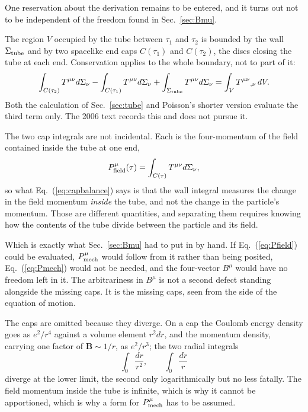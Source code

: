\documentclass[preprint]{aastex701}
\begin{document}
One reservation about the derivation remains to be entered, and it turns out not
to be independent of the freedom found in Sec.~\ref{sec:Bmu}.

The region $V$ occupied by the tube between $\tau_1$ and $\tau_2$ is bounded by
the wall $\Sigma_{\rm tube}$ and by two spacelike end caps $C(\tau_1)$ and
$C(\tau_2)$, the discs closing the tube at each end. Conservation applies to the
whole boundary, not to part of it:
\begin{equation}
\int_{C(\tau_2)} T^{\mu\nu}d\Sigma_\nu
- \int_{C(\tau_1)} T^{\mu\nu}d\Sigma_\nu
+ \int_{\Sigma_{\rm tube}} T^{\mu\nu}d\Sigma_\nu
= \int_V T^{\mu\nu}{}_{,\nu}\,dV .
\label{eq:capbalance}
\end{equation}
Both the calculation of Sec.~\ref{sec:tube} and Poisson's shorter version
\citep{poisson2004}
evaluate the third term only. The 2006 text records this and does not pursue it.

The two cap integrals are not incidental. Each is the four-momentum of the field
contained inside the tube at one end,
\begin{equation}
P_{\rm field}^\mu(\tau) = \int_{C(\tau)} T^{\mu\nu}d\Sigma_\nu ,
\label{eq:Pfield}
\end{equation}
so what Eq.~(\ref{eq:capbalance}) says is that the wall integral measures the
change in the field momentum \emph{inside} the tube, and not the change in the
particle's momentum. Those are different quantities, and separating them
requires knowing how the contents of the tube divide between the particle and
its field.

Which is exactly what Sec.~\ref{sec:Bmu} had to put in by hand. If
Eq.~(\ref{eq:Pfield}) could be evaluated, $P_{\rm mech}^\mu$ would follow from it
rather than being posited, Eq.~(\ref{eq:Pmech}) would not be needed, and the
four-vector $B^\mu$ would have no freedom left in it. The arbitrariness in
$B^\mu$ is not a second defect standing alongside the missing caps. It is the
missing caps, seen from the side of the equation of motion.

The caps are omitted because they diverge. On a cap the Coulomb energy density
goes as $e^2/r^4$ against a volume element $r^2dr$, and the momentum density,
carrying one factor of $\mathbf B \sim 1/r$, as $e^2/r^3$; the two radial
integrals
\begin{equation}
\int_0 \frac{dr}{r^2}, \qquad \int_0 \frac{dr}{r}
\label{eq:capdiv}
\end{equation}
diverge at the lower limit, the second only logarithmically but no less fatally.
The field momentum inside the tube is infinite, which is why it cannot be
apportioned, which is why a form for $P_{\rm mech}^\mu$ has to be assumed.
\end{document}
